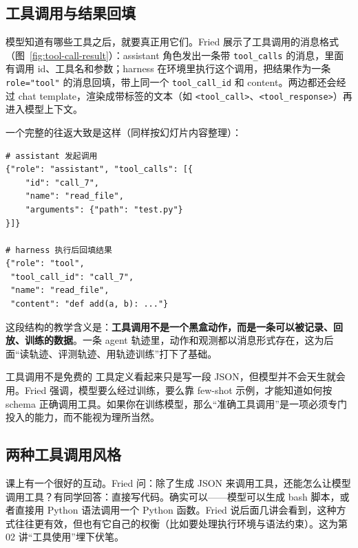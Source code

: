 \documentclass[a4paper]{article}
\begin{document}
\subsection{工具调用与结果回填}

模型知道有哪些工具之后，就要真正用它们。Fried 展示了工具调用的消息格式（图~\ref{fig:tool-call-result}）：assistant 角色发出一条带 \texttt{tool\_calls} 的消息，里面有调用 id、工具名和参数；harness 在环境里执行这个调用，把结果作为一条 \texttt{role="tool"} 的消息回填，带上同一个 \texttt{tool\_call\_id} 和 content。两边都还会经过 chat template，渲染成带标签的文本（如 \texttt{<tool\_call>}、\texttt{<tool\_response>}）再进入模型上下文。

一个完整的往返大致是这样（同样按幻灯片内容整理）：

\noindent\begin{minipage}{\linewidth}
\begin{lstlisting}[caption={一次工具调用与结果回填的消息结构（按幻灯片内容整理）},label={lst:tool-call-result}]
# assistant 发起调用
{"role": "assistant", "tool_calls": [{
    "id": "call_7",
    "name": "read_file",
    "arguments": {"path": "test.py"}
}]}

# harness 执行后回填结果
{"role": "tool",
 "tool_call_id": "call_7",
 "name": "read_file",
 "content": "def add(a, b): ..."}
\end{lstlisting}
\end{minipage}

这段结构的教学含义是：\textbf{工具调用不是一个黑盒动作，而是一条可以被记录、回放、训练的数据}。一条 agent 轨迹里，动作和观测都以消息形式存在，这为后面“读轨迹、评测轨迹、用轨迹训练”打下了基础。

\begin{warningbox}{工具调用不是免费的}
工具定义看起来只是写一段 JSON，但模型并不会天生就会用。Fried 强调，模型要么经过训练，要么靠 few-shot 示例，才能知道如何按 schema 正确调用工具。如果你在训练模型，那么“准确工具调用”是一项必须专门投入的能力，而不能视为理所当然。
\end{warningbox}

\subsection{两种工具调用风格}

课上有一个很好的互动。Fried 问：除了生成 JSON 来调用工具，还能怎么让模型调用工具？有同学回答：直接写代码。确实可以——模型可以生成 bash 脚本，或者直接用 Python 语法调用一个 Python 函数。Fried 说后面几讲会看到，这种方式往往更有效，但也有它自己的权衡（比如要处理执行环境与语法约束）。这为第 02 讲“工具使用”埋下伏笔。
\end{document}
